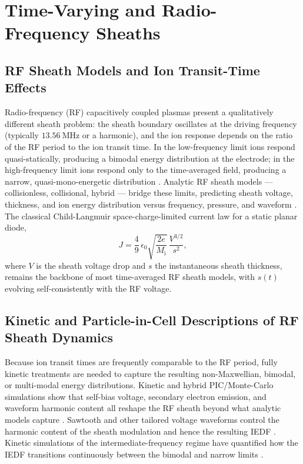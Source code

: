 \section{Time-Varying and Radio-Frequency Sheaths}

\subsection{RF Sheath Models and Ion Transit-Time Effects}

Radio-frequency (RF) capacitively coupled plasmas present a qualitatively different sheath problem: the sheath boundary oscillates at the driving frequency (typically $\SI{13.56}{\mega\hertz}$ or a harmonic), and the ion response depends on the ratio of the RF period to the ion transit time. In the low-frequency limit ions respond quasi-statically, producing a bimodal energy distribution at the electrode; in the high-frequency limit ions respond only to the time-averaged field, producing a narrow, quasi-mono-energetic distribution \cite{ref0055}. Analytic RF sheath models — collisionless, collisional, hybrid — bridge these limits, predicting sheath voltage, thickness, and ion energy distribution versus frequency, pressure, and waveform \cite{ref0038}. The classical Child-Langmuir space-charge-limited current law for a static planar diode,
\begin{equation}
J = \frac{4}{9}\,\epsilon_{0}\sqrt{\frac{2e}{M_{\mathrm{i}}}}\,\frac{V^{3/2}}{s^{2}},
\label{ch23-eq:child-langmuir}
\end{equation}
where $V$ is the sheath voltage drop and $s$ the instantaneous sheath thickness, remains the backbone of most time-averaged RF sheath models, with $s(t)$ evolving self-consistently with the RF voltage.

\subsection{Kinetic and Particle-in-Cell Descriptions of RF Sheath Dynamics}

Because ion transit times are frequently comparable to the RF period, fully kinetic treatments are needed to capture the resulting non-Maxwellian, bimodal, or multi-modal energy distributions. Kinetic and hybrid PIC/Monte-Carlo simulations show that self-bias voltage, secondary electron emission, and waveform harmonic content all reshape the RF sheath beyond what analytic models capture \cite{ref0637}. Sawtooth and other tailored voltage waveforms control the harmonic content of the sheath modulation and hence the resulting IEDF \cite{ref0043}. Kinetic simulations of the intermediate-frequency regime have quantified how the IEDF transitions continuously between the bimodal and narrow limits \cite{ref0040}.

